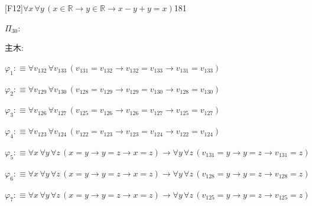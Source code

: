 \begin{fullproof}{[F12]}{$\forall x\,\forall y\,(x \in \mathbb{R} \to y \in \mathbb{R} \to x - y + y = x)$}{181}
\begin{ptree}
\noLine
{}
\end{ptree}
\noindent$\Pi_{30}$:
\begin{ptree}
\noLine
{}
\noLine
{}
\end{ptree}
\noindent 主木:
\begin{ptree}
\noLine
{}
\noLine
{}
\end{ptree}
\begin{abbrevlist}
\item $\varphi_{1} :\equiv \forall v_{132}\,\forall v_{133}\,(v_{131} = v_{132} \to v_{132} = v_{133} \to v_{131} = v_{133})$
\item $\varphi_{2} :\equiv \forall v_{129}\,\forall v_{130}\,(v_{128} = v_{129} \to v_{129} = v_{130} \to v_{128} = v_{130})$
\item $\varphi_{3} :\equiv \forall v_{126}\,\forall v_{127}\,(v_{125} = v_{126} \to v_{126} = v_{127} \to v_{125} = v_{127})$
\item $\varphi_{4} :\equiv \forall v_{123}\,\forall v_{124}\,(v_{122} = v_{123} \to v_{123} = v_{124} \to v_{122} = v_{124})$
\item $\varphi_{5} :\equiv \forall x\,\forall y\,\forall z\,(x = y \to y = z \to x = z) \to \forall y\,\forall z\,(v_{131} = y \to y = z \to v_{131} = z)$
\item $\varphi_{6} :\equiv \forall x\,\forall y\,\forall z\,(x = y \to y = z \to x = z) \to \forall y\,\forall z\,(v_{128} = y \to y = z \to v_{128} = z)$
\item $\varphi_{7} :\equiv \forall x\,\forall y\,\forall z\,(x = y \to y = z \to x = z) \to \forall y\,\forall z\,(v_{125} = y \to y = z \to v_{125} = z)$

\end{abbrevlist}
\end{fullproof}
